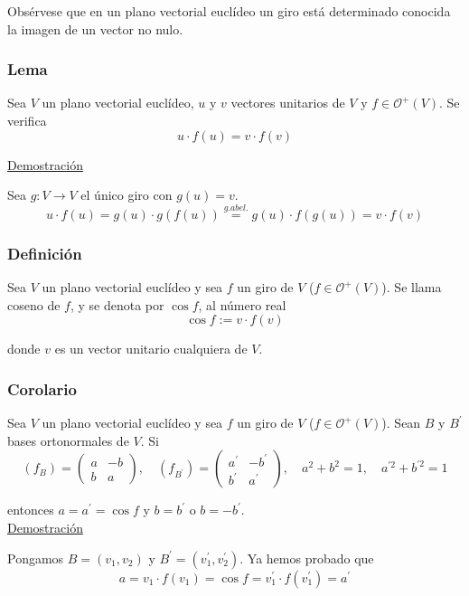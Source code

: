 \documentclass[12pt, a4paper, ones, notitlepage, openany,titlepage]{article}
\begin{document}
Obsérvese que en un plano vectorial euclídeo un giro está determinado conocida la imagen de un vector no nulo.

\subsubsection{Lema}
Sea $V$ un plano vectorial euclídeo, $u$ y $v$ vectores unitarios de $V$ y $f \in \mathcal{O}^{+}(V)$. Se verifica
$$
u \cdot f(u)=v \cdot f(v)
$$

\noindent\underline{Demostración}

\noindent Sea $g : V \longrightarrow V$ el único giro con $g(u) = v$.
$$
u \cdot f(u)=g(u) \cdot g(f(u)) \overset{g. abel.}{=} g(u) \cdot f(g(u))=v \cdot f(v)
$$

\subsubsection{Definición}
Sea $V$ un plano vectorial euclídeo y sea $f$ un giro de $V$ ($f \in \mathcal{O}^+(V)$). Se llama coseno de $f$, y se denota por $\cos f$, al número real
$$
\cos f:=v \cdot f(v)
$$

\noindent donde $v$ es un vector unitario cualquiera de $V$.

\subsubsection{Corolario}
Sea $V$ un plano vectorial euclídeo y sea $f$ un giro de $V$ ($f \in \mathcal{O}^+(V)$). Sean $B$ y $B^{\prime}$ bases ortonormales de $V$. Si
$$
(f_{B})=\left(\begin{array}{rr}
	a & -b \\
	b & a
\end{array}\right), \quad (f_{B^{\prime}})=\left(\begin{array}{rr}
	a^{\prime} & -b^{\prime} \\
	b^{\prime} & a^{\prime}
\end{array}\right), \quad a^{2}+b^{2}=1, \quad a^{\prime 2}+b^{\prime 2}=1
$$

\noindent entonces $a=a^{\prime}=\cos f$ y $b= b^{\prime}$ o $b= -b^{\prime}$.\\

\noindent\underline{Demostración}

Pongamos $B=\left(v_{1}, v_{2}\right)$ y $B^{\prime}=\left(v_{1}^{\prime}, v_{2}^{\prime}\right)$. Ya hemos probado que
$$
a=v_{1} \cdot f\left(v_{1}\right)=\cos f=v_{1}^{\prime} \cdot f\left(v_{1}^{\prime}\right)=a^{\prime}
$$
\end{document}
